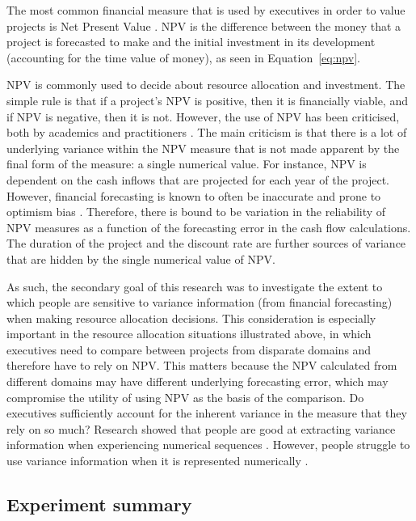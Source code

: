 \documentclass[a4paper, nobind, dvipsnames]{templates/ociamthesis}
\theoremstyle{definition}
\theoremstyle{definition}
\theoremstyle{definition}
\theoremstyle{definition}
\theoremstyle{remark}
\begin{document}
The most common financial measure that is used by executives in order to value
projects is Net Present Value \autocite[NPV;][]{graham2001}. NPV is the difference between
the money that a project is forecasted to make and the initial investment in its
development (accounting for the time value of money), as seen in
Equation~\eqref{eq:npv}.

NPV is commonly used to decide about resource allocation and investment. The
simple rule is that if a project's NPV is positive, then it is financially
viable, and if NPV is negative, then it is not. However, the use of NPV has been
criticised, both by academics and practitioners \autocite{fox2008,willigers2017}. The
main criticism is that there is a lot of underlying variance within the NPV
measure that is not made apparent by the final form of the measure: a single
numerical value. For instance, NPV is dependent on the cash inflows that are
projected for each year of the project. However, financial forecasting is known
to often be inaccurate and prone to optimism bias \autocite{lovallo2003,puri2007}.
Therefore, there is bound to be variation in the reliability of NPV measures as
a function of the forecasting error in the cash flow calculations. The duration
of the project and the discount rate are further sources of variance that are
hidden by the single numerical value of NPV.

As such, the secondary goal of this research was to investigate the extent to
which people are sensitive to variance information (from financial forecasting)
when making resource allocation decisions. This consideration is especially
important in the resource allocation situations illustrated above, in which
executives need to compare between projects from disparate domains and therefore
have to rely on NPV. This matters because the NPV calculated from different
domains may have different underlying forecasting error, which may compromise
the utility of using NPV as the basis of the comparison. Do executives
sufficiently account for the inherent variance in the measure that they rely on
so much? Research showed that people are good at extracting variance information
when experiencing numerical sequences \autocite{rosenbaum2020}. However, people struggle
to use variance information when it is represented numerically \autocite{galesic2010,konold1993,vivalt2018,batteux2020}.

\subsection{Experiment summary}
\end{document}
